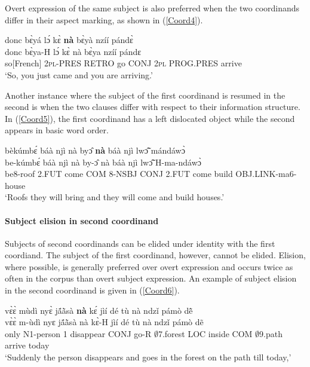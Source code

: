 \noindent Overt expression of the same subject is also preferred when the two coordinands differ in their aspect marking, as shown in (\ref{Coord4}).

\begin{exe} 
\ex\label{Coord4} 
  \glll  donc bɛ̀yá lɔ́ kɛ̀ {\bfseries nà} bɛ̀yà nzíí pándɛ̀ \\
          donc bɛ̀ya-H lɔ́ kɛ̀ nà bɛ̀ya nzíí pándɛ \\
          so[French] 2\textsc{pl}-PRES RETRO go CONJ 2\textsc{pl} PROG.PRES arrive \\
    \trans `So, you just came and you are arriving.'
\end{exe}

Another instance where the subject of the first coordinand is resumed in the second is when the two clauses differ with respect to their information structure. In (\ref{Coord5}), the first coordinand has a left dislocated object while the second appears in basic word order.

\begin{exe} 
\ex\label{Coord5} 
  \glll   bèkúmbɛ́ báà njì nà byɔ̂ {\bfseries nà} báà njì lwɔ̃̂ mándáwɔ̀ \\
          be-kúmbɛ́ báà njì nà by-ɔ̂ nà báà njì lwɔ̃̂ H-ma-ndáwɔ̀ \\
           be8-roof  2.FUT come COM 8-NSBJ CONJ 2.FUT come build OBJ.LINK-ma6-house\\
    \trans `Roofs they will bring and they will come and build houses.'
\end{exe}

\paragraph{Subject elision in second coordinand}
Subjects of second coordinands can be elided under identity with the first coordiand. The subject of the first coordinand, however, cannot be elided. Elision, where possible, is generally preferred over overt expression and occurs twice as often in the corpus than overt subject expression. An example of subject elision in the second coordinand is given in (\ref{Coord6}).

\begin{exe} 
\ex\label{Coord6}
  \glll   vɛ̀ɛ̀ mùdì nyɛ̀ jã́ã̀sà {\bfseries nà} kɛ́ jìí dé tù nà ndzǐ pámò dẽ̂\\
           vɛ̀ɛ̀ m-ùdì nyɛ jã́ã̀sà nà kɛ̀-H jìí dé tù nà ndzǐ pámò dẽ \\
           only N1-person 1 disappear CONJ go-R $\emptyset$7.forest LOC inside COM $\emptyset$9.path arrive today \\
    \trans `Suddenly the person disappears and goes in the forest on the path till today,'
\end{exe}

